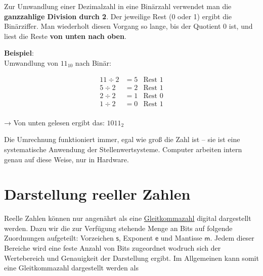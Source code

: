\documentclass[
  letterpaper,
  DIV=11,
  numbers=noendperiod]{scrreprt}
\begin{document}
Zur Umwandlung einer Dezimalzahl in eine Binärzahl verwendet man die
\textbf{ganzzahlige Division durch 2}. Der jeweilige Rest (0 oder 1)
ergibt die Binärziffer. Man wiederholt diesen Vorgang so lange, bis der
Quotient 0 ist, und liest die Reste \textbf{von unten nach oben}.

\textbf{Beispiel}:\\
Umwandlung von \(11_{10}\) nach Binär:

\[
\begin{array}{rcl}
11 \div 2 &= 5 &\text{Rest } 1 \\
5 \div 2  &= 2 &\text{Rest } 1 \\
2 \div 2  &= 1 &\text{Rest } 0 \\
1 \div 2  &= 0 &\text{Rest } 1 \\
\end{array}
\]

→ Von unten gelesen ergibt das: \(1011_2\)

\begin{tcolorbox}[enhanced jigsaw, left=2mm, leftrule=.75mm, bottomrule=.15mm, title=\textcolor{quarto-callout-note-color}{\faInfo}\hspace{0.5em}{Merke}, colback=white, arc=.35mm, breakable, titlerule=0mm, bottomtitle=1mm, colbacktitle=quarto-callout-note-color!10!white, toprule=.15mm, opacityback=0, coltitle=black, rightrule=.15mm, opacitybacktitle=0.6, toptitle=1mm, colframe=quarto-callout-note-color-frame]

Die Umrechnung funktioniert immer, egal wie groß die Zahl ist -- sie ist
eine systematische Anwendung der Stellenwertsysteme. Computer arbeiten
intern genau auf diese Weise, nur in Hardware.

\end{tcolorbox}

\section{Darstellung reeller Zahlen}\label{darstellung-reeller-zahlen}

Reelle Zahlen können nur angenährt als eine
\href{https://de.wikipedia.org/wiki/Gleitkommazahl}{Gleitkommazahl}
digital dargestellt werden. Dazu wir die zur Verfügung stehende Menge an
Bits auf folgende Zuordnungen aufgeteilt: Vorzeichen \(\mathsf s\),
Exponent \(\mathsf e\) und Mantisse \(\mathsf m\). Jedem dieser Bereiche
wird eine feste Anzahl von Bits zugeordnet wodruch sich der Wertebereich
und Genauigkeit der Darstellung ergibt. Im Allgemeinen kann somit eine
Gleitkommazahl dargestellt werden als
\end{document}
